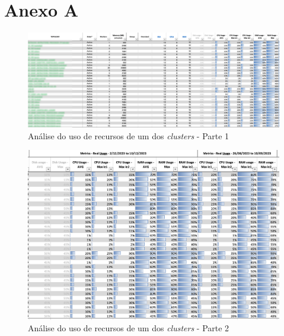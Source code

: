\chapter{Anexo A} 	
\label{appendix-a}

\begin{figure}[H]
  \centerline{\includegraphics[scale=0.3]{media/content/analise/analise-ofsec-1.png}}
  \caption{Análise do uso de recursos de um dos \textit{clusters} - Parte 1}
  \label{analise-ofsec-1}
\end{figure}

\begin{figure}[H]
  \centerline{\includegraphics[scale=0.3]{media/content/analise/analise-ofsec-2.png}}
  \caption{Análise do uso de recursos de um dos \textit{clusters} - Parte 2}
  \label{analise-ofsec-2}
\end{figure}


